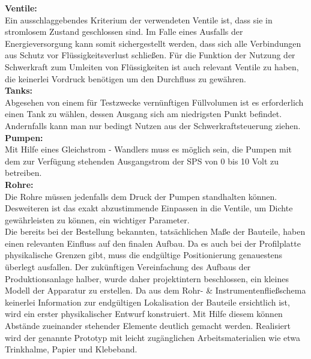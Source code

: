 	\textbf{Ventile:}\\
	Ein ausschlaggebendes Kriterium der verwendeten Ventile ist, dass sie in stromlosem Zustand geschlossen sind. Im Falle eines Ausfalls der Energieversorgung kann somit sichergestellt werden, dass sich alle Verbindungen aus Schutz vor Flüssigkeitsverlust schließen. Für die Funktion der Nutzung der Schwerkraft zum Umleiten von Flüssigkeiten ist auch relevant Ventile zu haben, die keinerlei Vordruck benötigen um den Durchfluss zu gewähren.\\

	\textbf{Tanks:}\\
	Abgesehen von einem für Testzwecke vernünftigen Füllvolumen ist es erforderlich einen Tank zu wählen, dessen Ausgang sich am niedrigsten Punkt befindet. Andernfalls kann man nur bedingt Nutzen aus der Schwerkraftsteuerung ziehen.\\
	
	\textbf{Pumpen:}\\
	Mit Hilfe eines Gleichstrom - Wandlers muss es möglich sein, die Pumpen mit dem zur Verfügung stehenden Ausgangstrom der SPS von 0 bis 10 Volt zu betreiben.\\
	
	\textbf{Rohre:}\\
	Die Rohre müssen jedenfalls dem Druck der Pumpen standhalten können. Desweiteren ist das exakt abzustimmende Einpassen in die Ventile, um Dichte gewährleisten zu können, ein wichtiger Parameter.\\

	Die bereits bei der Bestellung bekannten, tatsächlichen Maße der Bauteile, haben einen relevanten Einfluss auf den finalen Aufbau. Da es auch bei der Profilplatte physikalische Grenzen gibt, muss die endgültige Positionierung genauestens überlegt ausfallen. Der zukünftigen Vereinfachung des Aufbaus der Produktionsanlage halber, wurde daher projektintern beschlossen, ein kleines Modell der Apparatur zu erstellen. Da aus dem Rohr- \& Instrumentenfließschema keinerlei Information zur endgültigen Lokalisation der Bauteile ersichtlich ist, wird ein erster physikalischer Entwurf konstruiert. Mit Hilfe diesem können Abstände zueinander stehender Elemente deutlich gemacht werden. Realisiert wird der genannte Prototyp mit leicht zugänglichen Arbeitsmaterialien wie etwa Trinkhalme, Papier und Klebeband.\\

